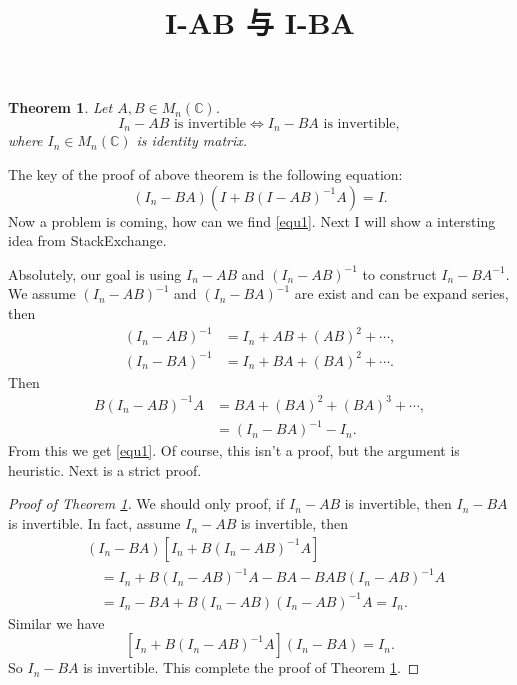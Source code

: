 \documentclass[a4paper,12pt]{article}
\title{I-AB 与 I-BA}
\newtheorem{theorem}{Theorem}[section]
\theoremstyle{definition}
\begin{document}
\begin{CJK*}{UTF8}{gbsn}

\maketitle

\begin{theorem} \label{thm1}
    Let $ A, B \in M_n(\mathbb{C}) $.
    $$
        I_n-AB \text{ is invertible} \Longleftrightarrow I_n-BA \text{ is invertible},
    $$
    where $ I_n \in M_n(\mathbb{C}) $ is identity matrix.
\end{theorem}

The key of the proof of above theorem is the following equation:
\begin{equation} \label{equ1}
    (I_n - BA)(I + B (I - AB)^{-1} A) = I.
\end{equation}
Now a problem is coming, how can we find \eqref{equ1}. Next I will show a intersting idea from StackExchange.

Absolutely, our goal is using $ I_n-AB $ and $ (I_n-AB)^{-1} $ to construct $ {I_n - BA}^{-1} $.
We assume $ (I_n - AB)^{-1} $ and $ (I_n - BA)^{-1} $ are exist and can be expand series, then
\begin{align*}
    (I_n - AB)^{-1} &= I_n + AB + (AB)^2 + \cdots, \\
    (I_n - BA)^{-1} &= I_n + BA + (BA)^2 + \cdots.
\end{align*}
Then
\begin{align*}
    B(I_n - AB)^{-1}A &= BA + (BA)^2 + (BA)^3 + \cdots, \\
                      &= (I_n - BA)^{-1} - I_n.
\end{align*}
From this we get \eqref{equ1}. Of course, this isn't a proof, but the argument is heuristic. Next is a strict proof.

\begin{proof}[Proof of Theorem \ref{thm1}]
    We should only proof, if $ I_n-AB $ is invertible, then $ I_n-BA $ is invertible.
    In fact, assume $ I_n-AB $ is invertible, then
    \begin{align*}
        &(I_n - BA)[I_n + B (I_n - AB)^{-1} A] \\
            &\quad= I_n + B (I_n - AB)^{-1} A - BA - BAB (I_n - AB)^{-1} A \\
            &\quad= I_n - BA + B (I_n - AB) (I_n - AB)^{-1} A = I_n.
    \end{align*}
    Similar we have
    $$
        [I_n + B (I_n - AB)^{-1} A](I_n - BA) = I_n.
    $$
    So $ I_n-BA $ is invertible. This complete the proof of Theorem \ref{thm1}.
\end{proof}

\end{CJK*}
\end{document}
